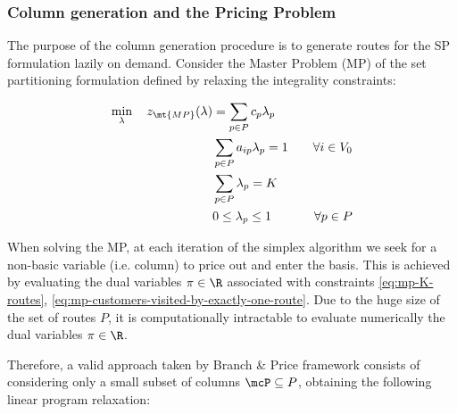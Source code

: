 \subsubsection{Column generation and the Pricing Problem}
\label{sec:column-generation-and-pricing-problem}

The purpose of the column generation procedure is to generate routes for the SP formulation lazily on demand.
Consider the Master Problem (MP) of the set partitioning formulation defined by relaxing the integrality constraints:

\begin{align}
	\min_{\lambda} \quad z_\mt{MP}(\lambda) & = \sum_{p \in P}  c_p \lambda_p \label{eq:mp-obj-func}                                                                                                                             \\
	                                        & \sum_{p \in P}  a_{ip} \lambda_p = 1                   & \quad \forall i \in V_0                                              \label{eq:mp-customers-visited-by-exactly-one-route} \\
	                                        & \sum_{p \in P} \lambda_{p} = K\label{eq:mp-K-routes}                                                                                                                               \\
	                                        & 0 \le \lambda_p \le 1                                  & \quad \forall p \in P \label{eq:mp-lambda-mip-var-bounds}
\end{align}


When solving the MP, at each iteration of the simplex algorithm we seek for a non-basic variable (i.e. column) to price out and enter the basis.
This is achieved by evaluating the dual variables $\pi \in \R$ associated with constraints \eqref{eq:mp-K-routes}, \eqref{eq:mp-customers-visited-by-exactly-one-route}.
Due to the huge size of the set of routes $P$, it is computationally intractable to evaluate numerically the dual variables $\pi \in \R$.

\medskip

Therefore, a valid approach taken by Branch \& Price framework consists of considering only a small subset of columns $\mcP \subseteq P$, obtaining the following linear program relaxation:

